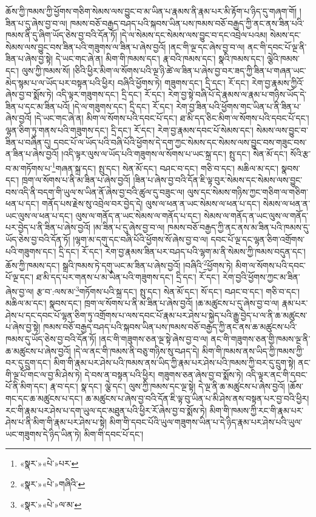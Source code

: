 ཆོས་ཀྱི་ཁམས་ཀྱི་ཕྱོགས་གཅིག་སེམས་ལས་བྱུང་བ་མ་ཡིན་པ་རྣམས་ནི་རྣམ་པར་མི་རྟོག་པ་ཉིད་དུ་གཞག་གོ། །ཟིན་པ་དུ་ཞེས་བྱ་བ་ལ། ཁམས་བཅོ་བརྒྱད་བཤད་པའི་སྐབས་ཡིན་པས་ཁམས་བཅོ་བརྒྱད་ཀྱི་ནང་ནས་ཟིན་པའི་ཁམས་ནི་དུ་ཞིག་ཡོད་ཅེས་བྱ་བའི་དོན་ཏོ། །དེ་ལ་སེམས་དང་སེམས་ལས་བྱུང་བ་དང་འབྲེལ་པའམ། སེམས་དང་སེམས་ལས་བྱུང་བས་ཟིན་པའི་གཟུགས་ལ་ཟིན་པ་ཞེས་བྱའོ། །ནང་གི་ལྔ་དང་ཞེས་བྱ་བ་ལ། ནང་གི་དབང་པོ་ལྔ་ནི་ཟིན་པ་ཞེས་བྱ་སྟེ། དེ་ཡང་གང་ཞེ་ན། མིག་གི་ཁམས་དང་། རྣ་བའི་ཁམས་དང་། སྣའི་ཁམས་དང་། ལྕེའི་ཁམས་དང་། ལུས་ཀྱི་ཁམས་སོ། །ཅིའི་ཕྱིར་མིག་ལ་སོགས་པའི་ལྔ་ཉི་ཚེ་ལ་ཟིན་པ་ཞེས་བྱ་བར་ཟད་ཀྱི་ཟིན་པ་གཞན་ཡང་མེད་སྙམ་པ་ལ་ཡོད་པར་བསྟན་པའི་ཕྱིར། བཞིའི་ཕྱོགས་ཏེ། གཟུགས་དང་། དྲི་དང་། རོ་དང་། རེག་བྱ་རྣམས་ཀྱིའོ་ཞེས་བྱ་བ་སྨོས་ཏེ། འདི་ལྟར་གཟུགས་དང་། དྲི་དང་། རོ་དང་། རེག་བྱ་སྟེ་བཞི་པོ་དེ་རྣམས་ལ་རྣམ་པ་གཉིས་ཡོད་དེ་ཟིན་པ་དང་མ་ཟིན་པའོ། །དེ་ལ་གཟུགས་དང་། དྲི་དང་། རོ་དང་། རེག་བྱ་ཟིན་པའི་ཕྱོགས་གང་ཡིན་པ་ནི་ཟིན་པ་ཞེས་བྱའོ། །དེ་ཡང་གང་ཞེ་ན། མིག་ལ་སོགས་པའི་དབང་པོ་དང་། ཐ་མི་དད་ཅིང་མིག་ལ་སོགས་པའི་དབང་པོ་དང་། ལྷན་ཅིག་ཏུ་གནས་པའི་གཟུགས་དང་། དྲི་དང་། རོ་དང་། རེག་བྱ་རྣམས་དབང་པོ་སེམས་དང་། སེམས་ལས་བྱུང་བ་ཟིན་པ་བཞིན་དུ། དབང་པོ་ལ་ཡོད་པའི་བཞི་པོའི་ཕྱོགས་དེ་དག་ཀྱང་སེམས་དང་སེམས་ལས་བྱུང་བས་གཟུང་བས་ན་ཟིན་པ་ཞེས་བྱའོ། །འདི་ལྟར་ལུས་ལ་ཡོད་པའི་གཟུགས་ལ་སོགས་པ་ཡང་སྐྲ་དང་། སྤུ་དང་། སེན་མོ་དང་། སོའི་རྩ་བ་མ་གཏོགས་པ་\footnote{«སྣར་»«པེ་»པར་}གཞན་སྐྲ་དང་། སྤུ་དང་། སེན་མོ་དང་། བཤང་བ་དང་། གཅི་བ་དང་། མཆིལ་མ་དང་། སྣབས་དང་། ཁྲག་ལ་སོགས་པ་ནི་མ་ཟིན་པ་ཞེས་བྱའོ། །ཟིན་པ་ཞེས་བྱ་བའི་དོན་ཇི་ལྟ་བུར་སེམས་དང་སེམས་ལས་བྱུང་བས་འདི་ནི་བདག་གི་ཡུལ་ས་ཡིན་ནོ་ཞེས་བྱ་བའི་ཚུལ་དུ་བཟུང་ལ། ལུས་དང་སེམས་གཉིས་ཀྱང་གཅིག་ལ་གཅིག་ཕན་པ་དང་། གནོད་པས་རྗེས་སུ་འབྲེལ་བར་བྱེད་དེ། ལུས་ལ་ཕན་ན་ཡང་སེམས་ལ་ཕན་པ་དང་། སེམས་ལ་ཕན་ན་ཡང་ལུས་ལ་ཕན་པ་དང་། ལུས་ལ་གནོད་ན་ཡང་སེམས་ལ་གནོད་པ་དང་། སེམས་ལ་གནོད་ན་ཡང་ལུས་ལ་གནོད་པར་བྱེད་པ་ནི་ཟིན་པ་ཞེས་བྱའོ། །མ་ཟིན་པ་དུ་ཞེས་བྱ་བ་ལ། ཁམས་བཅོ་བརྒྱད་ཀྱི་ནང་ནས་མ་ཟིན་པའི་ཁམས་དུ་ཡོད་ཅེས་བྱ་བའི་དོན་ཏོ། །ལྷག་མ་དགུ་དང་བཞི་པོའི་ཕྱོགས་སོ་ཞེས་བྱ་བ་ལ། དབང་པོ་ལྔ་དང་ལྷན་ཅིག་འགྲོགས་པའི་གཟུགས་དང་། དྲི་དང་། རོ་དང་། རེག་བྱ་རྣམས་ཟིན་པར་བཤད་པའི་ལྷག་མ་ནི་སེམས་ཀྱི་ཁམས་བདུན་དང་། ཆོས་ཀྱི་ཁམས་དང་། སྒྲའི་ཁམས་ཏེ་དགུ་ཡང་མ་ཟིན་པ་ཞེས་བྱའོ། །བཞིའི་\footnote{«སྣར་»«པེ་»གཞིའི་}ཕྱོགས་ཏེ། མིག་ལ་སོགས་པའི་དབང་པོ་ལྔ་དང་། ཐ་མི་དད་པར་གནས་པ་མ་ཡིན་པའི་གཟུགས་དང་། དྲི་དང་། རོ་དང་། རེག་བྱའི་ཕྱོགས་ཀྱང་མ་ཟིན་ཞེས་བྱ་ལ། རྩ་བ་:ལས་མ་\footnote{«སྣར་»«པེ་»ལ་མ་}གཏོགས་པའི་སྐྲ་དང་། སྤུ་དང་། སེན་མོ་དང་། སོ་དང་། བཤང་བ་དང་། གཅི་བ་དང་། མཆིལ་མ་དང་། སྣབས་དང་། ཁྲག་ལ་སོགས་པ་ནི་མ་ཟིན་པ་ཞེས་བྱའོ། །ཆ་མཚུངས་པ་དུ་ཞེས་བྱ་བ་ལ། རྣམ་པར་ཤེས་པ་དང་དབང་པོ་ལྷན་ཅིག་ཏུ་འགྲོགས་པ་ལས་དབང་པོ་རྣམ་པར་ཤེས་པ་སྐྱེད་པའི་རྒྱུ་བྱེད་པ་ལ་ནི་ཆ་མཚུངས་པ་ཞེས་བྱ་སྟེ། ཁམས་བཅོ་བརྒྱད་བཤད་པའི་སྐབས་ཡིན་པས་ཁམས་བཅོ་བརྒྱད་ཀྱི་ནང་ནས་ཆ་མཚུངས་པའི་ཁམས་དུ་ཡོད་ཅེས་བྱ་བའི་དོན་ཏོ། །ནང་གི་གཟུགས་ཅན་ལྔ་སྟེ་ཞེས་བྱ་བ་ལ། ནང་གི་གཟུགས་ཅན་གྱི་ཁམས་ལྔ་ནི་ཆ་མཚུངས་པ་ཞེས་བྱའོ། །དེ་ལ་ནང་གི་ཁམས་ནི་བཅུ་གཉིས་སུ་བཤད་དེ། མིག་གི་ཁམས་ནས་ཡིད་ཀྱི་ཁམས་ཀྱི་བར་དུ་དྲུག་དང་། མིག་གི་རྣམ་པར་ཤེས་པའི་ཁམས་ནས་ཡིད་ཀྱི་རྣམ་པར་ཤེས་པའི་ཁམས་ཀྱི་བར་དུ་དྲུག་སྟེ། ནང་གི་ལྔ་པོ་གང་ལ་བྱ་མི་ཤེས་ཏེ། དེ་བས་ན་བསྟན་པའི་ཕྱིར། གཟུགས་ཅན་ཞེས་བྱ་བ་སྨོས་ཏེ། འདི་ལྟར་ནང་གི་དབང་པོ་ནི་མིག་དང་། རྣ་བ་དང་། སྣ་དང་། ལྕེ་དང་། ལུས་ཀྱི་ཁམས་དང་ལྔ་སྟེ། དེ་ལྔ་ནི་ཆ་མཚུངས་པ་ཞེས་བྱའོ། །ཆོས་གང་དང་ཆ་མཚུངས་པ་དང་། ཆ་མཚུངས་པ་ཞེས་བྱ་བའི་དོན་ཇི་ལྟ་བུ་ཡིན་པ་མི་ཤེས་ནས་བསྟན་པར་བྱ་བའི་ཕྱིར། རང་གི་རྣམ་པར་ཤེས་པ་དག་ཡུལ་དང་མཐུན་པའི་ཕྱིར་རོ་ཞེས་བྱ་བ་སྨོས་ཏེ། མིག་གི་ཁམས་ཀྱི་རང་གི་རྣམ་པར་ཤེས་པ་ནི་མིག་གི་རྣམ་པར་ཤེས་པ་སྟེ། མིག་གི་དབང་པོའི་ཡུལ་གཟུགས་ཡིན་པ་དེ་ཉིད་རྣམ་པར་ཤེས་པའི་ཡུལ་ཡང་གཟུགས་དེ་ཉིད་ཡིན་ཏེ། མིག་གི་དབང་པོ་དང་། 